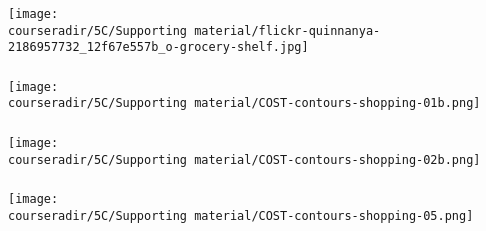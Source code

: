 \documentclass[11pt,aspectratio=169,mathserif]{beamer}
\begin{document}
\begin{frame}\frametitle{}
	\centerline{\texttt{[image: \\courseradir/5C/Supporting material/flickr-quinnanya-2186957732\_12f67e557b\_o-grocery-shelf.jpg]}}
\end{frame}
\begin{frame}\frametitle{}
	\centerline{\texttt{[image: \\courseradir/5C/Supporting material/COST-contours-shopping-01b.png]}}
\end{frame}
\begin{frame}\frametitle{}
	\centerline{\texttt{[image: \\courseradir/5C/Supporting material/COST-contours-shopping-02b.png]}}
\end{frame}
\begin{frame}\frametitle{}
	\centerline{\texttt{[image: \\courseradir/5C/Supporting material/COST-contours-shopping-05.png]}}
\end{frame}
\end{document}
